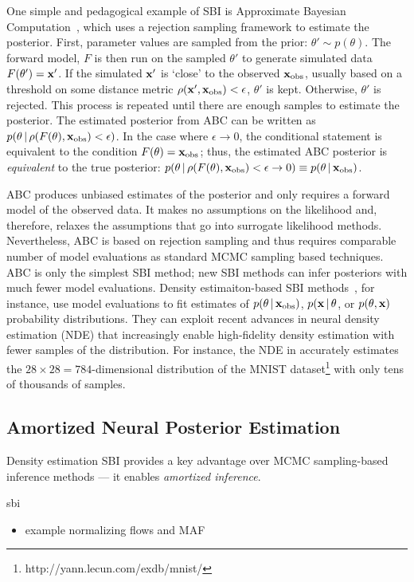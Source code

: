 One simple and pedagogical example of SBI is Approximate Bayesian
Computation~\citep[ABC;][]{rubin1984, pritchard1999, beaumont2002}, which uses
a rejection sampling framework to estimate the posterior. 
First, parameter values are sampled from the prior: $\theta'\sim p(\theta)$. 
The forward model, $F$ is then run on the sampled $\theta'$ to generate
simulated data $F(\theta') = {\bf x}'$.
If the simulated ${\bf x}'$ is `close' to the observed ${\bf x}_{\rm obs}$, usually based
on a threshold on some distance metric $\rho({\bf x}', {\bf x}_{\rm obs}) < \epsilon$, 
$\theta'$ is kept. 
Otherwise, $\theta'$ is rejected. 
This process is repeated until there are enough samples to estimate the
posterior. 
The estimated posterior from ABC can be written as 
$p(\theta \,|\, \rho(F(\theta), {\bf x}_{\rm obs}) < \epsilon)$. 
In the case where $\epsilon\rightarrow 0$, the conditional statement is
equivalent to the condition $F(\theta) = {\bf x}_{\rm obs}$; thus, the estimated ABC
posterior is {\em equivalent} to the true posterior:
$p(\theta \,|\, \rho(F(\theta), {\bf x}_{\rm obs}) < \epsilon\rightarrow 0) \equiv
p(\theta \,|\, {\bf x}_{\rm obs})$.

ABC produces unbiased estimates of the posterior and only requires a forward
model of the observed data.
It makes no assumptions on the likelihood and, therefore, relaxes the
assumptions that go into surrogate likelihood methods. 
Nevertheless, ABC is based on rejection sampling and thus requires comparable
number of model evaluations as standard MCMC sampling based techniques. 
ABC is only the simplest SBI method; new SBI methods can infer posteriors with
much fewer model evaluations.
Density estimaiton-based SBI methods~\citep[\eg][]{papamakarios2017,
alsing2018, hahn2019c, greenberg2019, tejero-cantero2020}, for instance, use
model evaluations to fit estimates of $p(\theta\,|\,{\bf x}_{\rm obs})$, $p({\bf
x}\,|\, \theta$, or $p(\theta, {\bf x})$ probability distributions.  
They can exploit recent advances in neural density estimation (NDE) that
increasingly enable high-fidelity density estimation with fewer samples of the
distribution.
For instance, the NDE in \cite{papamakarios2017} accurately estimates the
$28\times28=784$-dimensional distribution of the MNIST
dataset\footnote{http://yann.lecun.com/exdb/mnist/} with only tens of thousands
of samples. 

\subsection{Amortized Neural Posterior Estimation} \label{sec:flow}
Density estimation SBI provides a key advantage over MCMC sampling-based
inference methods --- it enables \emph{amortized inference}. 


sbi~\citep{greenberg2019, tejero-cantero2020}

\cite{wong2020}
\cite{dax2021}
\cite{zhang2021}

\begin{itemize}
    \item example normalizing flows and MAF 
\end{itemize}
